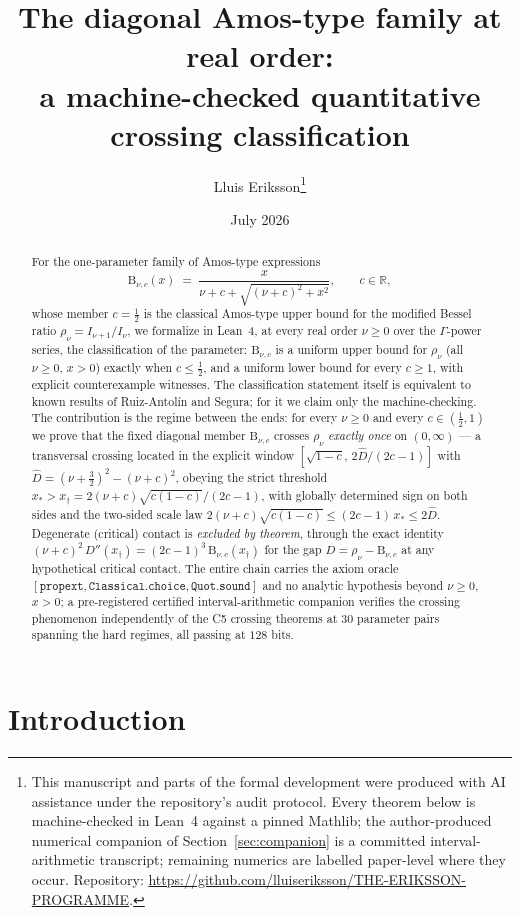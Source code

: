 \documentclass[11pt]{article}
\title{The diagonal Amos-type family at real order:\\
a machine-checked quantitative crossing classification}
\author{Lluis Eriksson\thanks{This manuscript and parts of the formal
development were produced with AI assistance under the repository's
audit protocol.  Every theorem below is machine-checked in Lean~4
against a pinned Mathlib; the author-produced numerical companion of
Section~\ref{sec:companion} is a committed interval-arithmetic
transcript; remaining numerics are labelled paper-level where they
occur.  Repository:
\url{https://github.com/lluiseriksson/THE-ERIKSSON-PROGRAMME}.}}
\date{July 2026}
\newcommand{\lean}[1]{\texttt{#1}}
\newcommand{\Bfam}{\mathrm{B}}
\begin{document}
\maketitle

\begin{abstract}
For the one-parameter family of Amos-type expressions
\[
\Bfam_{\nu,c}(x) \;=\; \frac{x}{\nu+c+\sqrt{(\nu+c)^2+x^2}},
\qquad c \in \mathbb{R},
\]
whose member $c = \tfrac12$ is the classical Amos-type upper bound
for the modified Bessel ratio $\rho_\nu = I_{\nu+1}/I_\nu$, we
formalize in Lean~4, at every real order $\nu \ge 0$ over the
$\Gamma$-power series, the classification of the parameter:
$\Bfam_{\nu,c}$ is a uniform upper bound for $\rho_\nu$ (all
$\nu \ge 0$, $x > 0$) exactly when $c \le \tfrac12$, and a uniform
lower bound for every $c \ge 1$, with explicit counterexample
witnesses.  The classification statement itself is
equivalent to known results of Ruiz-Antol\'in and Segura; for it we
claim only the machine-checking.  The contribution is the regime
between the ends: for every $\nu \ge 0$ and every
$c \in (\tfrac12, 1)$ we prove that the fixed diagonal member
$\Bfam_{\nu,c}$ crosses $\rho_\nu$ \emph{exactly once} on
$(0,\infty)$ --- a transversal crossing located in the explicit
window $[\sqrt{1-c},\, 2\hat{D}/(2c-1)]$ with
$\hat{D} = (\nu+\tfrac32)^2 - (\nu+c)^2$, obeying the strict
threshold $x_* > x_\dagger = 2(\nu+c)\sqrt{c(1-c)}/(2c-1)$, with
globally determined sign on both sides and the two-sided scale law
$2(\nu+c)\sqrt{c(1-c)} \le (2c-1)\,x_* \le 2\hat{D}$.  Degenerate
(critical) contact is \emph{excluded by theorem}, through the exact
identity $(\nu+c)^2\,D''(x_\dagger) = (2c-1)^3\,\Bfam_{\nu,c}(x_\dagger)$
for the gap $D = \rho_\nu - \Bfam_{\nu,c}$ at any hypothetical
critical contact.  The entire chain carries the
axiom oracle
$[\lean{propext}, \lean{Classical.choice}, \lean{Quot.sound}]$ and
no analytic hypothesis beyond $\nu \ge 0$, $x > 0$; a pre-registered
certified interval-arithmetic companion verifies the crossing
phenomenon independently of the C5 crossing theorems at $30$ parameter
pairs spanning the hard regimes, all passing at $128$ bits.
\end{abstract}

\section{Introduction}
\end{document}
